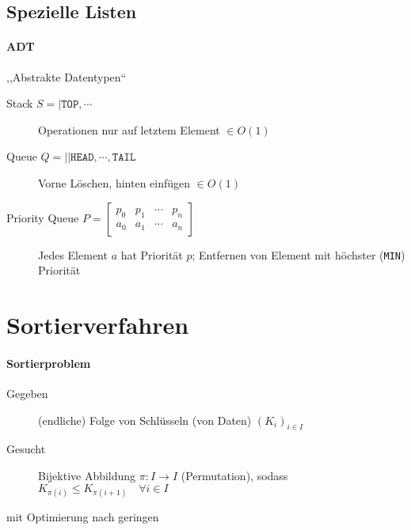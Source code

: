 \subsection{Spezielle Listen}

\paragraph{ADT} ,,Abstrakte Datentypen``

\begin{description}
  \item [Stack $S = | \texttt{TOP}, \cdots$]
        Operationen nur auf letztem Element $\in O(1)$

  \item [Queue $Q = || \texttt{HEAD}, \cdots, \texttt{TAIL}$]
        Vorne Löschen, hinten einfügen $\in O(1)$

  \item [Priority Queue $P = \begin{bmatrix}
            p_0 & p_1 & \cdots & p_n \\
            a_0 & a_1 & \cdots & a_n
          \end{bmatrix}$]
        Jedes Element $a$ hat Priorität $p$; Entfernen von Element mit höchster (\texttt{MIN}) Priorität
\end{description}

\section{Sortierverfahren}

\begin{mzImportant}
  \paragraph{Sortierproblem}

  \begin{description}
    \item[Gegeben] (endliche) Folge von Schlüsseln (von Daten) $(K_i)_{i \in I}$
    \item[Gesucht] Bijektive Abbildung $\pi: I \rightarrow I$ (Permutation), sodass $K_{\pi(i)} \leq K_{\pi(i + 1)} \quad \forall i \in I$
  \end{description}
\end{mzImportant}

mit Optimierung nach geringen

